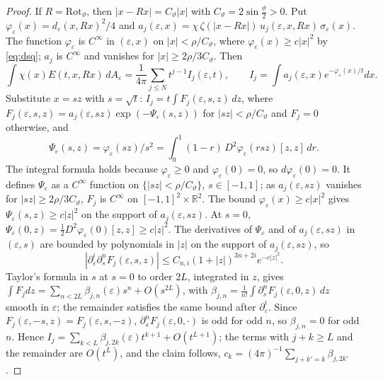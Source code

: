 \documentclass[pdflatex,sn-mathphys-num]{sn-jnl}
\theoremstyle{thmstyleone}%
\theoremstyle{thmstylethree}%
\newcommand{\R}{\mathbb{R}}
\begin{document}
\begin{appendices}
\begin{proof}
If $R=\mathrm{Rot}_\vartheta$, then $|x-Rx|=C_\vartheta|x|$ with $C_\vartheta=2\sin\frac\vartheta2>0$. Put $\varphi_\varepsilon(x)=d_\varepsilon(x,Rx)^2/4$ and $a_j(\varepsilon,x)=\chi\,\zeta(|x-Rx|)\,u_j(\varepsilon,x,Rx)\,\sigma_\varepsilon(x)$. The function $\varphi_\varepsilon$ is $C^\infty$ in $(\varepsilon,x)$ on $|x|<\rho/C_\vartheta$, where $\varphi_\varepsilon(x)\ge c|x|^2$ by \eqref{eq:dsq}; $a_j$ is $C^\infty$ and vanishes for $|x|\ge2\rho/3C_\vartheta$. Then
\[
\int\chi(x)E(t,x,Rx)\,dA_\varepsilon=\frac1{4\pi}\sum_{j\le N}t^{j-1}I_j(\varepsilon,t),\qquad I_j=\int a_j(\varepsilon,x)e^{-\varphi_\varepsilon(x)/t}dx.
\]
Substitute $x=sz$ with $s=\sqrt t$: $I_j=t\int F_j(\varepsilon,s,z)\,dz$, where $F_j(\varepsilon,s,z)=a_j(\varepsilon,sz)\exp(-\Psi_\varepsilon(s,z))$ for $|sz|<\rho/C_\vartheta$ and $F_j=0$ otherwise, and
\[
\Psi_\varepsilon(s,z)=\varphi_\varepsilon(sz)/s^2=\int_0^1(1-r)\,D^2\varphi_\varepsilon(rsz)[z,z]\,dr .
\]
The integral formula holds because $\varphi_\varepsilon\ge0$ and $\varphi_\varepsilon(0)=0$, so $d\varphi_\varepsilon(0)=0$. It defines $\Psi_\varepsilon$ as a $C^\infty$ function on $\{|sz|<\rho/C_\vartheta\}$, $s\in[-1,1]$; as $a_j(\varepsilon,sz)$ vanishes for $|sz|\ge2\rho/3C_\vartheta$, $F_j$ is $C^\infty$ on $[-1,1]^2\times\R^2$. The bound $\varphi_\varepsilon(x)\ge c|x|^2$ gives $\Psi_\varepsilon(s,z)\ge c|z|^2$ on the support of $a_j(\varepsilon,sz)$. At $s=0$, $\Psi_\varepsilon(0,z)=\frac12D^2\varphi_\varepsilon(0)[z,z]\ge c|z|^2$. The derivatives of $\Psi_\varepsilon$ and of $a_j(\varepsilon,sz)$ in $(\varepsilon,s)$ are bounded by polynomials in $|z|$ on the support of $a_j(\varepsilon,sz)$, so
\[
|\partial_\varepsilon^i\partial_s^nF_j(\varepsilon,s,z)|\le C_{n,i}(1+|z|)^{3n+2i}e^{-c|z|^2}.
\]
Taylor's formula in $s$ at $s=0$ to order $2L$, integrated in $z$, gives $\int F_jdz=\sum_{n<2L}\beta_{j,n}(\varepsilon)s^n+O(s^{2L})$, with $\beta_{j,n}=\frac1{n!}\int\partial_s^nF_j(\varepsilon,0,z)\,dz$ smooth in $\varepsilon$; the remainder satisfies the same bound after $\partial_\varepsilon^i$. Since $F_j(\varepsilon,-s,z)=F_j(\varepsilon,s,-z)$, $\partial_s^nF_j(\varepsilon,0,\cdot)$ is odd for odd $n$, so $\beta_{j,n}=0$ for odd $n$. Hence $I_j=\sum_{k<L}\beta_{j,2k}(\varepsilon)t^{k+1}+O(t^{L+1})$; the terms with $j+k\ge L$ and the remainder are $O(t^L)$, and the claim follows, $c_k=(4\pi)^{-1}\sum_{j+k'=k}\beta_{j,2k'}$.


\end{proof}
\end{appendices}
\end{document}
